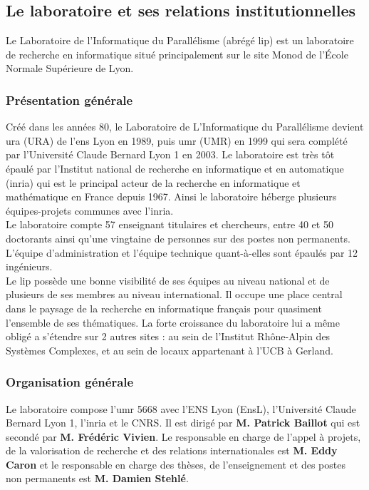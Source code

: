 \subsection{Le laboratoire et ses relations institutionnelles}
Le Laboratoire de l'Informatique du Parallélisme (abrégé \gls{lip}) est un laboratoire de recherche en informatique situé principalement sur le site Monod de l'École Normale Supérieure de Lyon.

\subsubsection{Présentation générale}
Créé dans les années 80, le Laboratoire de L'Informatique du Parallélisme devient \gls{ura} (URA) de l'\gls{ens} Lyon en 1989, puis \gls{umr} (UMR) en 1999 qui sera complété par l'Université Claude Bernard Lyon 1 en 2003. Le laboratoire est très tôt épaulé par l'Institut national de recherche en informatique et en automatique (\gls{inria}) qui est le principal acteur de la recherche en informatique et mathématique en France depuis 1967. Ainsi le laboratoire héberge plusieurs équipes-projets communes avec l'\gls{inria}. \cite{reportHCERES}\\

Le laboratoire compte 57 enseignant titulaires et chercheurs, entre 40 et 50 doctorants ainsi qu'une vingtaine de personnes sur des postes non permanents. L'équipe d'administration et l'équipe technique quant-à-elles sont épaulés par 12 ingénieurs.\\

Le \gls{lip} possède une bonne visibilité de ses équipes au niveau national et de plusieurs de ses membres au niveau international. Il occupe une place central dans le paysage de la recherche en informatique français pour quasiment l'ensemble de ses thématiques. La forte croissance du laboratoire lui a même obligé a s'étendre sur 2 autres sites : au sein de l’Institut Rhône-Alpin des Systèmes Complexes, et au sein de locaux appartenant à l’UCB à Gerland.

\subsubsection{Organisation générale}
Le laboratoire compose l'\gls{umr} 5668 avec l'ENS Lyon (EnsL), l'Université Claude Bernard Lyon 1, l'\gls{inria} et le CNRS. Il est dirigé par \textbf{M. Patrick Baillot} qui est secondé par \textbf{M. Frédéric Vivien}. Le responsable en charge de l'appel à projets, de la valorisation de recherche et des relations internationales est \textbf{M. Eddy Caron} et le responsable en charge des thèses, de l'enseignement et des postes non permanents est \textbf{M. Damien Stehlé}.

